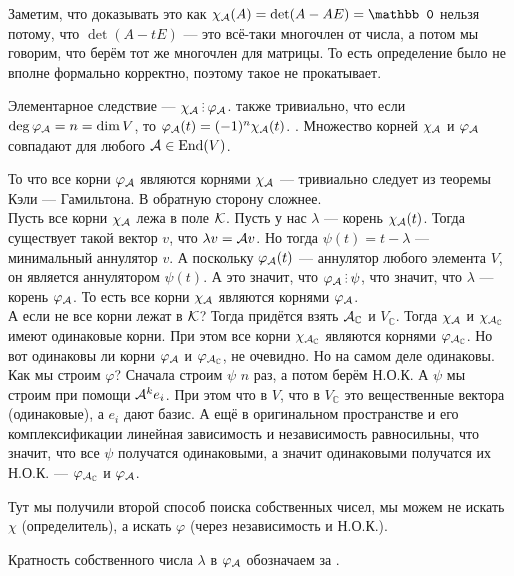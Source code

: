 \documentclass{article}
\begin{document}
\begin{itemize}
\begin{Proof}
        \end{Proof}
        \begin{Comment}
            Заметим, что доказывать это как $\chi_\scriptA(A)=\det(A-AE)=\mathbb0$ нельзя потому, что $\det(A-tE)$ --- это всё-таки многочлен от числа, а потом мы говорим, что берём тот же многочлен для матрицы. То есть определение было не вполне формально корректно, поэтому такое не прокатывает.
        \end{Comment}
        \thm Элементарное следствие --- $\chi_\scriptA\divby\varphi_\scriptA$.
        \thm также тривиально, что если $\deg\varphi_{\mathcal{A}}=n=\dim V$, то $\varphi_{\mathcal{A}}(t)=(-1)^n\chi_{\mathcal{A}}(t)$.
        \thm {}. Множество корней $\chi_{\mathcal{A}}$ и $\varphi_{\mathcal{A}}$ совпадают для любого ${\mathcal{A}}\in\operatorname{End}(V)$.
        \begin{Proof}
            То что все корни $\varphi_{\mathcal{A}}$ являются корнями $\chi_{\mathcal{A}}$ --- тривиально следует из теоремы Кэли --- Гамильтона. В обратную сторону сложнее.\\
            Пусть все корни $\chi_{\mathcal{A}}$ лежа в поле ${\mathcal{K}}$. Пусть у нас $\lambda$ --- корень $\chi_{\mathcal{A}}(t)$. Тогда существует такой вектор $v$, что $\lambda v={\mathcal{A}} v$. Но тогда $\psi(t)=t-\lambda$ --- минимальный аннулятор $v$. А поскольку $\varphi_{\mathcal{A}}(t)$ --- аннулятор любого элемента $V$, он является аннулятором $\psi(t)$. А это значит, что $\varphi_\scriptA\divby\psi$, что значит, что $\lambda$ --- корень $\varphi_{\mathcal{A}}$. То есть все корни $\chi_{\mathcal{A}}$ являются корнями $\varphi_{\mathcal{A}}$.\\
            А если не все корни лежат в ${\mathcal{K}}$? Тогда придётся взять ${\mathcal{A}}_\mathbb C$ и $V_\mathbb C$. Тогда $\chi_{\mathcal{A}}$ и $\chi_{{\mathcal{A}}_\mathbb C}$ имеют одинаковые корни. При этом все корни $\chi_{{\mathcal{A}}_\mathbb C}$ являются корнями $\varphi_{{\mathcal{A}}_\mathbb C}$. Но вот одинаковы ли корни $\varphi_{\mathcal{A}}$ и $\varphi_{{\mathcal{A}}_\mathbb C}$, не очевидно. Но на самом деле одинаковы. Как мы строим $\varphi$? Сначала строим $\psi$ $n$ раз, а потом берём Н.О.К. А $\psi$ мы строим при помощи ${\mathcal{A}}^k e_i$. При этом что в $V$, что в $V_\mathbb C$ это вещественные вектора (одинаковые), а $e_i$ дают базис. А ещё в оригинальном пространстве и его комплексификации линейная зависимость и независимость равносильны, что значит, что все $\psi$ получатся одинаковыми, а значит одинаковыми получатся их Н.О.К. --- $\varphi_{{\mathcal{A}}_\mathbb C}$ и $\varphi_{\mathcal{A}}$.
        \end{Proof}
        \begin{Comment}
            Тут мы получили второй способ поиска собственных чисел, мы можем не искать $\chi$ (определитель), а искать $\varphi$ (через независимость и Н.О.К.).
        \end{Comment}
        \dfn Кратность собственного числа $\lambda$ в $\varphi_{\mathcal{A}}$ обозначаем за .
    \end{itemize}
\end{document}
